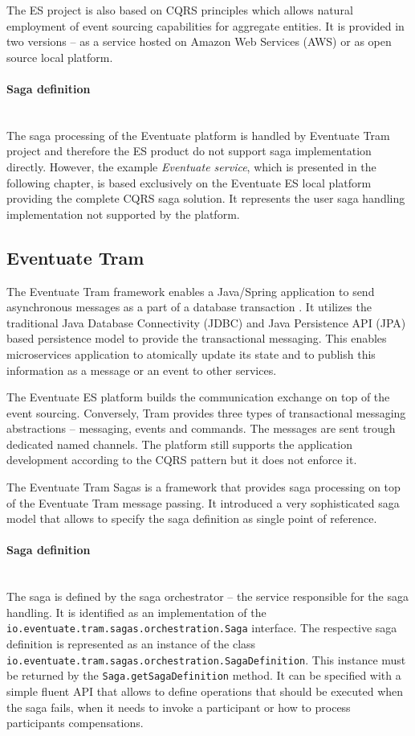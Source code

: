 \documentclass[oneside,
  digital, %
  table,   %
  nolof,     %
  nolot,     %
]{fithesis3}
\newcommand{\newlinepar}[1]{\paragraph{#1}\needspace{4\baselineskip}\mbox{}\\}
\begin{document}
The ES project is also based on CQRS principles which allows natural employment of event sourcing capabilities for aggregate entities. It is provided in two versions -- as a service hosted on Amazon Web Services (AWS) or as open source local platform.

\newlinepar{Saga definition}

The saga processing of the Eventuate platform is handled by Eventuate Tram project and therefore the ES product do not support saga implementation directly. However, the example \textit{Eventuate service}, which is presented in the following chapter, is based exclusively on the Eventuate ES local platform providing the complete CQRS saga solution. It represents the user saga handling implementation not supported by the platform. 

\subsection{Eventuate Tram}
\label{sec:eventuate-tram}

The Eventuate Tram framework enables a Java/Spring application to send asynchronous messages as a part of a database transaction \cite{eventuate-tram}. It utilizes the traditional Java Database Connectivity (JDBC) and Java Persistence API (JPA) based persistence model to provide the transactional messaging. This enables microservices application to atomically update its state and to publish this information as a message or an event to other services.

The Eventuate ES platform builds the communication exchange on top of the event sourcing. Conversely, Tram provides three types of transactional messaging abstractions -- messaging, events and commands. The messages are sent trough dedicated named channels. The platform still supports the application development according to the CQRS pattern but it does not enforce it.

The Eventuate Tram Sagas is a framework that provides saga processing on top of the Eventuate Tram message passing. It introduced a very sophisticated saga model that allows to specify the saga definition as single point of reference. 

\newlinepar{Saga definition}

The saga is defined by the saga orchestrator -- the service responsible for the saga handling. It is identified as an implementation of the \texttt{io.eventuate.tram.sagas.orchestration.Saga} interface. The respective saga definition is represented as an instance of the class \texttt{io.eventuate.tram.sagas.orchestration.SagaDefinition}. This instance must be returned by the \texttt{Saga.getSagaDefinition} method. It can be specified with a simple fluent API that allows to define operations that should be executed when the saga fails, when it needs to invoke a participant or how to process participants compensations. 
\end{document}
